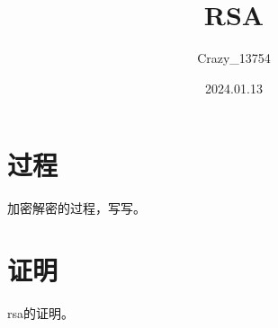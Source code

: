 \documentclass[a4paper]{article}
\title{\heiti\zihao{2} RSA}
\author{\songti Crazy\_13754}
\date{2024.01.13}
\begin{document}
    \maketitle
\tableofcontents
\section{过程}
加密解密的过程，写写。
\section[awa]{证明}
rsa的证明。
\end{document}
